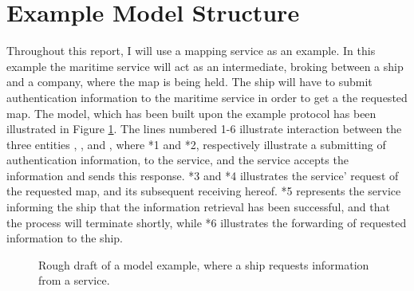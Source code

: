 \section{Example Model Structure}
Throughout this report, I will use a mapping service as an example. In this example the maritime service will act as an intermediate, broking between a ship and a company, where the map is being held. The ship will have to submit authentication information to the maritime service in order to get a the requested map. The model, which has been built upon the example protocol has been illustrated in Figure \ref{fig:modelExProtocol}. The lines numbered 1-6 illustrate interaction between the three entities , , and , where *1 and *2, respectively illustrate a submitting of authentication information, to the service, and the service accepts the information and sends this response. *3 and *4 illustrates the service' request of the requested map, and its subsequent receiving hereof. *5 represents the service informing the ship that the information retrieval has been successful, and that the process will terminate shortly, while *6 illustrates the forwarding of requested information to the ship.

\begin{figure}[h]
	\centering
	\caption{Rough draft of a model example, where a ship requests information from a service.}
	\label{fig:modelExProtocol}
\end{figure}


